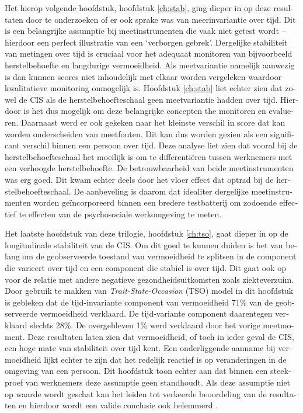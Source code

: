 \begin{otherlanguage}{dutch}
Het hierop volgende hoofdstuk, hoofdstuk \ref{ch:stab}, ging dieper in op deze resultaten door te onderzoeken of er ook sprake was van meerinvariantie over tijd. Dit is een belangrijke assumptie bij meetinstrumenten die vaak niet getest wordt -- hierdoor een perfect illustratie van een `verborgen gebrek'. Dergelijke stabiliteit van metingen over tijd is cruciaal voor het adequaat monitoren van bijvoorbeeld herstelbehoefte en langdurige vermoeidheid. Als meetvariantie namelijk aanwezig is dan kunnen scores niet inhoudelijk met elkaar worden vergeleken waardoor kwalitatieve monitoring onmogelijk is. Hoofdstuk \ref{ch:stab} liet echter zien dat zowel de CIS als de herstelbehoefteschaal geen meetvariantie hadden over tijd. Hierdoor is het dus mogelijk om deze belangrijke concepten the monitoren en evalueren. Daarnaast werd er ook gekeken naar het kleinste verschil in score dat kan worden onderscheiden van meetfouten. Dit kan dus worden gezien als een significant verschil binnen een persoon over tijd. Deze analyse liet zien dat vooral bij de herstelbehoefteschaal het moeilijk is om te differenti\"eren tussen werknemers met een verhoogde herstelbehoefte. De betrouwbaarheid van beide meetinstrumenten was erg goed. Dit kwam echter deels door het vloer effect dat optrad bij de herstelbehoefteschaal. De aanbeveling is daarom dat idealiter dergelijke meetinstrumenten worden ge\"incorporeerd binnen een bredere testbatterij om zodoende effectief te effecten van de psychosociale werkomgeving te meten. 

Het laatste hoofdstuk van deze trilogie, hoofdstuk \ref{ch:tso}, gaat dieper in op de longitudinale stabiliteit van de CIS. Om dit goed te kunnen duiden is het van belang om de geobserveerde toestand van vermoeidheid te splitsen in de component die varieert over tijd en een component die stabiel is over tijd. Dit gaat ook op voor de relatie met andere negatieve gezondheidsuitkomsten zoals ziekteverzuim. Door gebruik te makken van \textit{Trait-State-Occasion} (TSO) model  \parencite{Prenoveau_2011,Prenoveau_2016} in dit hoofdstuk is gebleken dat de tijd-invariante component van vermoeidheid 71\% van de geobserveerde vermoeidheid verklaard. De tijd-variante component daarentegen verklaard slechts 28\%. De overgebleven 1\% werd verklaard door het vorige meetmoment. Deze resultaten laten zien dat vermoeidheid, of toch in ieder geval de CIS, een hoge mate van stabiliteit over tijd kent. Een onderliggende aanname bij vermoeidheid lijkt echter te zijn dat het redelijk reactief is op veranderingen in de omgeving van een persoon. Dit hoofdstuk toon echter aan dat binnen een steekproef van werknemers deze assumptie geen standhoudt. Als deze assumptie niet op waarde wordt geschat kan het leiden tot verkeerde beoordeling van de resultaten en hierdoor wordt een valide conclusie ook belemmerd \parencite{Hamaker_2015}.


\end{otherlanguage}

